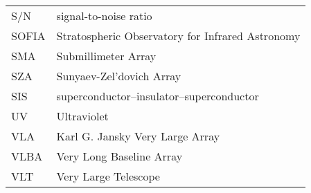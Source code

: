 \begin{center}
\begin{longtable}{ll}
S/N & signal-to-noise ratio\\
SOFIA & Stratospheric Observatory for Infrared Astronomy\\
SMA & Submillimeter Array \\
SZA & Sunyaev-Zel'dovich Array \\
SIS & superconductor–insulator–superconductor \\
UV & Ultraviolet \\
VLA & Karl G. Jansky Very Large Array \\
VLBA & Very Long Baseline Array \\
VLT & Very Large Telescope \\
\end{longtable}
\end{center}

